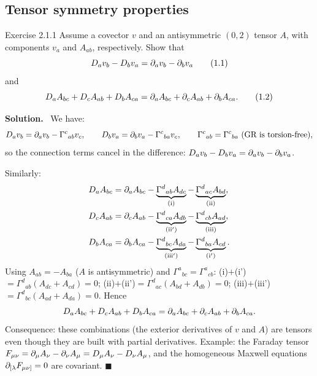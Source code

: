 \documentclass[11pt,a4paper]{article}
\numberwithin{equation}{subsection}
\newenvironment{solution}{\par\noindent\textbf{\textcolor{excol!70!black}{Solution.}}\ }{\hfill$\blacksquare$\par\medskip}
\newcommand{\added}[1]{{\color{teal!60!black}#1}}
\begin{document}
\subsection{Tensor symmetry properties}
\begin{problem}{Exercise 2.1.1}
Assume a covector $v$ and an antisymmetric $(0,2)$ tensor $A$, with components $v_a$ and $A_{ab}$, respectively. Show that
\[
  D_av_b-D_bv_a=\partial_av_b-\partial_bv_a \tag{1.1}
\]
and
\[
  D_aA_{bc}+D_cA_{ab}+D_bA_{ca}=\partial_aA_{bc}+\partial_cA_{ab}+\partial_bA_{ca}. \tag{1.2}
\]
\end{problem}
\begin{solution}
We have:
\[
  D_av_b=\pd_av_b-\Gamma^c{}_{ab}v_c,\qquad D_bv_a=\pd_bv_a-\Gamma^c{}_{ba}v_c,\qquad\Gamma^c{}_{ab}=\Gamma^c{}_{ba}\ \text{(GR is torsion-free)},
\]
so the connection terms cancel in the difference: $D_av_b-D_bv_a=\partial_av_b-\partial_bv_a$.

Similarly:
\begin{align*}
  D_aA_{bc}&=\partial_aA_{bc}-\underbrace{\Gamma^d{}_{ab}A_{dc}}_{\rm(i)}-\underbrace{\Gamma^d{}_{ac}A_{bd}}_{\rm(ii)},\\
  D_cA_{ab}&=\partial_cA_{ab}-\underbrace{\Gamma^d{}_{ca}A_{db}}_{\rm(ii')}-\underbrace{\Gamma^d{}_{cb}A_{ad}}_{\rm(iii)},\\
  D_bA_{ca}&=\partial_bA_{ca}-\underbrace{\Gamma^d{}_{bc}A_{da}}_{\rm(iii')}-\underbrace{\Gamma^d{}_{ba}A_{cd}}_{\rm(i')}.
\end{align*}
Using $A_{ab}=-A_{ba}$ ($A$ is antisymmetric) and $\Gamma^a{}_{bc}=\Gamma^a{}_{cb}$:
(i)$+$(i')$=\Gamma^d{}_{ab}(A_{dc}+A_{cd})=0$; (ii)$+$(ii')$=\Gamma^d{}_{ac}(A_{bd}+A_{db})=0$; (iii)$+$(iii')$=\Gamma^d{}_{bc}(A_{ad}+A_{da})=0$. Hence
\[
  D_aA_{bc}+D_cA_{ab}+D_bA_{ca}=\partial_aA_{bc}+\partial_cA_{ab}+\partial_bA_{ca}.
\]
\added{Consequence: these combinations (the exterior derivatives of $v$ and $A$) are tensors even though they are built with partial derivatives. Example: the Faraday tensor $F_{\mu\nu}=\partial_\mu A_\nu-\partial_\nu A_\mu=D_\mu A_\nu-D_\nu A_\mu$, and the homogeneous Maxwell equations $\partial_{[\lambda}F_{\mu\nu]}=0$ are covariant.}
\end{solution}
\end{document}
